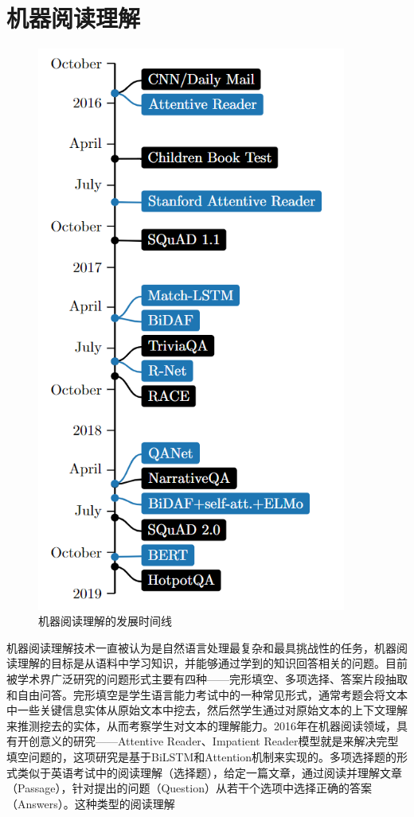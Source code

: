 \documentclass[twoside,a4paper,12pt]{book}%
\begin{document}
\section{机器阅读理解}
\begin{figure}[htbp]
\begin{center}
\includegraphics[width=4.0in]{figures/mrc1.png}
\caption{机器阅读理解的发展时间线} \label{fig:mrc1}
\end{center}
\end{figure}
机器阅读理解技术一直被认为是自然语言处理最复杂和最具挑战性的任务，机器阅读理解的目标是从语料中学习知识，并能够通过学到的知识回答相关的问题。目前被学术界广泛研究的问题形式主要有四种——完形填空、多项选择、答案片段抽取和自由问答。完形填空是学生语言能力考试中的一种常见形式，通常考题会将文本中一些关键信息实体从原始文本中挖去，然后然学生通过对原始文本的上下文理解来推测挖去的实体，从而考察学生对文本的理解能力。2016年在机器阅读领域，具有开创意义的研究——Attentive Reader、Impatient Reader模型就是来解决完型填空问题的，这项研究是基于BiLSTM和Attention机制来实现的。多项选择题的形式类似于英语考试中的阅读理解（选择题），给定一篇文章，通过阅读并理解文章（Passage），针对提出的问题（Question）从若干个选项中选择正确的答案（Answers）。这种类型的阅读理解
\end{document}
